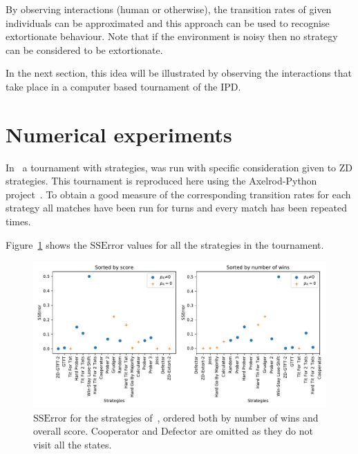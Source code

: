 \documentclass[a4paper]{article}
\begin{document}
By observing interactions (human or otherwise), the transition rates of given
individuals can be approximated and this approach can be used to recognise
extortionate behaviour. Note that if the environment is noisy then no strategy
can be considered to be extortionate.


In the next section, this idea will be illustrated by observing the interactions
that take place in a computer based tournament of the IPD\@.

\section{Numerical experiments}\label{sec:numerical-experiments}

In~\cite{Stewart2012} a tournament with
 strategies,
was run with specific consideration given to ZD strategies. This tournament is
reproduced here using the Axelrod-Python project~\cite{}. To obtain a good
measure of the corresponding transition rates for each strategy all matches have
been run for  turns and every match
has been repeated  times.

Figure~\ref{fig:SSError_overall_in_stewart_plotkin} shows the \(\text{SSError}\)
values for all the strategies in the tournament.

\begin{figure}[!htbp]
    \centering
    \includegraphics[width=.8\textwidth]{./assets/img/SSError_overall_in_stewart_plotkin/main.pdf}
    \caption{\(\text{SSError}\) for the strategies of~\cite{Stewart2012}, ordered both by
    number of wins and overall score. Cooperator and Defector are omitted as
    they do not visit all the states.}
    \label{fig:SSError_overall_in_stewart_plotkin}
\end{figure}
\end{document}
